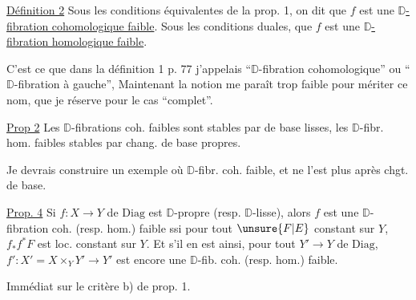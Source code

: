 

\uline{Définition 2} Sous les conditions équivalentes de la  prop. 1, on dit que $f$ est une $\mathbb D$\uline{-fibration cohomologique faible}. Sous les conditions duales, que $f$ est une $\mathbb D$\uline{-fibration homologique faible}.

C'est ce que dans la définition 1 p. 77 j'appelais ``$\mathbb D$-fibration cohomologique'' ou ``$\mathbb D$-fibration à gauche'',  Maintenant la notion me paraît trop faible pour mériter ce nom, que je réserve pour le cas ``complet''.

\uline{Prop 2} Les $\mathbb D$-fibrations coh. faibles sont stables par  de base lisses, les $\mathbb D$-fibr. hom. faibles stables par chang. de base propres.

Je devrais construire un exemple où  $\mathbb D$-fibr. coh. faible, et ne l'est plus après chgt. de base.


\uline{Prop. 4} Si $f:X\to Y$ de $\mathrm{Diag}$ est $\mathbb D$-propre (resp. $\mathbb D$-lisse), alors $f$ est une $\mathbb D$-fibration coh.  (resp. hom.) faible ssi pour tout $\unsure{F|E}$ constant sur $Y$, $f_* f^*F$  est loc. constant sur $Y$. Et s'il en est ainsi,  pour tout $Y'\to Y$ de $\mathrm{Diag}$, $f':X'=X\times_Y Y'\to Y'$ est encore une $\mathbb D$-fib. coh. (resp. hom.) faible.

 Immédiat sur le critère b) de prop. 1.

